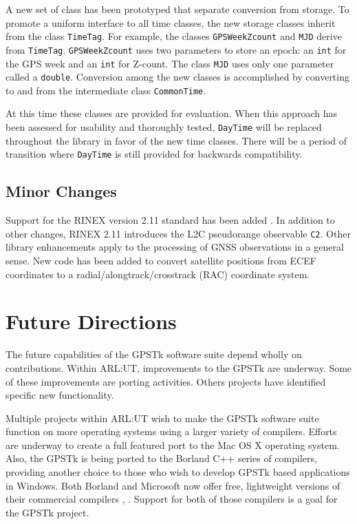 \documentclass{ion-gps}
\newcommand{\gpstkclass}[1]{\texttt{#1}}
\newcommand{\rinexobservable}[1]{\texttt{#1}}
\begin{document}
A new set of class has been prototyped that separate conversion from
storage. To promote a uniform interface to all time classes, the
new storage classes inherit from the class \gpstkclass{TimeTag}. For
example, the classes \gpstkclass{GPSWeekZcount} and \gpstkclass{MJD}
derive from \gpstkclass{TimeTag}. \gpstkclass{GPSWeekZcount}
uses two parameters to store an epoch: an \gpstkclass{int} for the GPS
week and an \gpstkclass{int} for Z-count. The class \gpstkclass{MJD}
uses only one parameter called a \gpstkclass{double}. Conversion among the new classes
is accomplished by converting to and from the intermediate class
\gpstkclass{CommonTime}.

At this time these classes are provided for evaluation. When this
approach has been assessed for usability and thoroughly tested, 
\gpstkclass{DayTime} will be replaced throughout the library in favor
of the new time classes. There will be a period of transition where
\gpstkclass{DayTime} is still provided for backwards compatibility.

\subsection*{Minor Changes}
Support for the RINEX version 2.11 standard has been added
\cite{rinex300format}. In addition to other changes, RINEX 2.11 introduces 
the L2C pseudorange observable \rinexobservable{C2}.  Other library 
enhancements apply to the processing of GNSS
observations in a general sense. New code has been added to convert
satellite positions from ECEF coordinates to a radial/alongtrack/crosstrack 
(RAC) coordinate system.


\section*{Future Directions}

The future capabilities of the GPSTk software suite depend wholly on
contributions. Within ARL:UT, improvements to the GPSTk are
underway. Some of these improvements are porting activities. Others
projects have identified specific new functionality.

Multiple projects within ARL:UT wish to make the \mbox{GPSTk} software
suite function on more operating systems using a larger variety of
compilers. Efforts are underway to create a full featured port to the
Mac OS X operating system. Also, the GPSTk is being ported to the
Borland C++ series of compilers, providing another choice to those who
wish to develop GPSTk based applications in Windows. Both Borland and Microsoft now offer free, lightweight versions of their commercial compilers \cite{borlandfreecompiler},
\cite{microsoftfreecompiler}. Support for both of those
compilers is a goal for the GPSTk project.
\end{document}
